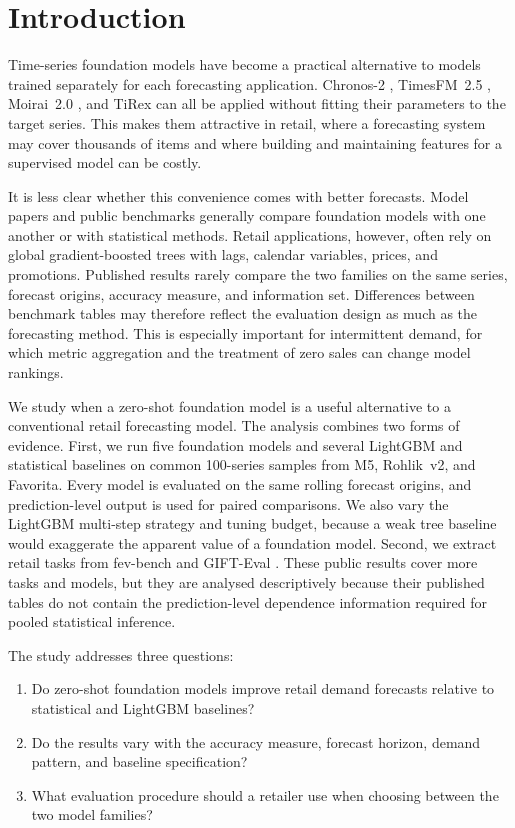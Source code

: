 \section{Introduction}
\label{sec:introduction}

Time-series foundation models have become a practical alternative to models
trained separately for each forecasting application. Chronos-2
\citep{ansari2025chronos2}, TimesFM~2.5 \citep{das2025timesfm2}, Moirai~2.0
\citep{liu2025moirai2}, and TiRex \citep{auer2025tirex} can all be applied
without fitting their parameters to the target series. This makes them
attractive in retail, where a forecasting system may cover thousands of items
and where building and maintaining features for a supervised model can be
costly.

It is less clear whether this convenience comes with better forecasts. Model
papers and public benchmarks generally compare foundation models with one
another or with statistical methods. Retail applications, however, often rely
on global gradient-boosted trees with lags, calendar variables, prices, and
promotions. Published results rarely compare the two families on the same
series, forecast origins, accuracy measure, and information set. Differences
between benchmark tables may therefore reflect the evaluation design as much
as the forecasting method. This is especially important for intermittent
demand, for which metric aggregation and the treatment of zero sales can
change model rankings.

We study when a zero-shot foundation model is a useful alternative to a
conventional retail forecasting model. The analysis combines two forms of
evidence. First, we run five foundation models and several LightGBM and
statistical baselines on common 100-series samples from M5, Rohlik~v2, and
Favorita. Every model is evaluated on the same rolling forecast origins, and
prediction-level output is used for paired comparisons. We also vary the
LightGBM multi-step strategy and tuning budget, because a weak tree baseline
would exaggerate the apparent value of a foundation model. Second, we extract
retail tasks from fev-bench \citep{shchur2025fevbench} and GIFT-Eval
\citep{aksu2024gift}. These public results cover more tasks and models, but
they are analysed descriptively because their published tables do not contain
the prediction-level dependence information required for pooled statistical
inference.

The study addresses three questions:
\label{sec:research-questions}
\begin{enumerate}
  \item Do zero-shot foundation models improve retail demand forecasts relative
    to statistical and LightGBM baselines?
  \item Do the results vary with the accuracy measure, forecast horizon,
    demand pattern, and baseline specification?
  \item What evaluation procedure should a retailer use when choosing between
    the two model families?
\end{enumerate}

